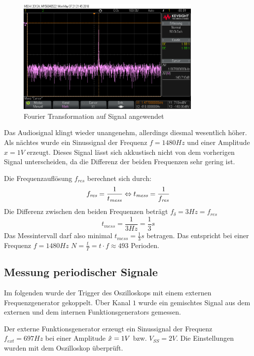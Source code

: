 \documentclass[a4paper]{article}
\begin{document}
\begin{figure}[H]
    \centering
    \includegraphics[width=0.8\textwidth]{aufgabe2_fft.png}
    \caption{Fourier Transformation auf Signal angewendet}
    \label{fig:aufgabe2-fft}
\end{figure}

Das Audiosignal klingt wieder unangenehm, allerdings diesmal wesentlich höher.
Als nächtes wurde ein Sinussignal der Frequenz $f=1480\si{Hz}$ und einer Amplitude $\hat{x}=1\si{V}$ erzeugt.
Dieses Signal lässt sich akkustisch nicht von dem vorherigen Signal unterscheiden, da die Differenz der beiden Frequenzen sehr gering ist.

Die Frequenzauflösung $f_{\textit{res}}$ berechnet sich durch:
\begin{equation*}
   f_{\textit{res}}=\frac{1}{t_{\textit{mess}}}\\
\Leftrightarrow t_{\textit{mess}}=\frac{1}{f_{\textit{res}}} 
\end{equation*}
Die Differenz zwischen den beiden Frequenzen beträgt $f_\delta=3\si{Hz}=f_{\textit{res}}$
\begin{equation*}
    t_{\textit{mess}}=\frac{1}{3\si{Hz}}=\frac{1}{3}\si{s}
\end{equation*}
Das Messintervall darf also minimal $t_{\textit{mess}}=\frac{1}{3}\si{s}$ betragen.
Das entspricht bei einer Frequenz $f=1480\si{Hz}$ $N=\frac{t}{T}=t\cdot f \approx 493$ Perioden.


\subsection{Messung periodischer Signale}
Im folgenden wurde der Trigger des Oszilloskops mit einem externen Frequenzgenerator gekoppelt.
Über Kanal $1$ wurde ein gemischtes Signal aus dem externen und dem internen Funktionsgenerators gemessen.

Der externe Funktionsgenerator erzeugt ein Sinussignal der Frequenz $f_\textit{ext}=697\si{Hz}$ bei einer Amplitude $\Hat{x}=1V$ bzw. $V_\textit{SS}=2V$. Die Einstellungen wurden mit dem Oszilloskop überprüft.
\end{document}
